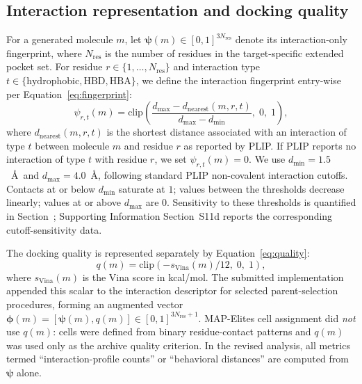 \documentclass[journal=jcisd8,manuscript=article]{achemso}
\begin{document}
\subsection{Interaction representation and docking quality}
\label{sec:fingerprint}

For a generated molecule $m$, let $\boldsymbol{\psi}(m)\in[0,1]^{3N_{\mathrm{res}}}$ denote its interaction-only fingerprint, where $N_{\mathrm{res}}$ is the number of residues in the target-specific extended pocket set. For residue $r\in\{1,\ldots,N_{\mathrm{res}}\}$ and interaction type $t\in\{\mathrm{hydrophobic},\mathrm{HBD},\mathrm{HBA}\}$, we define the interaction fingerprint entry-wise per Equation~\ref{eq:fingerprint}:
\begin{equation}
    \psi_{r,t}(m) = \text{clip}\left(\frac{d_\text{max} - d_\text{nearest}(m, r, t)}{d_\text{max} - d_\text{min}}, \; 0, \; 1\right),
\label{eq:fingerprint}
\end{equation}
where $d_\text{nearest}(m, r, t)$ is the shortest distance associated with an interaction of type $t$ between molecule $m$ and residue $r$ as reported by PLIP.\cite{salentin2015plip} If PLIP reports no interaction of type $t$ with residue $r$, we set $\psi_{r,t}(m) = 0$. We use $d_\text{min} = 1.5$~\AA\ and $d_\text{max} = 4.0$~\AA, following standard PLIP non-covalent interaction cutoffs.\cite{salentin2015plip} Contacts at or below $d_\text{min}$ saturate at $1$; values between the thresholds decrease linearly; values at or above $d_\text{max}$ are $0$. Sensitivity to these thresholds is quantified in Section~; Supporting Information Section~S11d reports the corresponding cutoff-sensitivity data.

The docking quality is represented separately by Equation~\ref{eq:quality}:
\begin{equation}
    q(m) = \text{clip}\left(-s_\text{Vina}(m)/12,\; 0,\; 1\right),
\label{eq:quality}
\end{equation}
where $s_\text{Vina}(m)$ is the Vina score in kcal/mol. The submitted implementation appended this scalar to the interaction descriptor for selected parent-selection procedures, forming an augmented vector $\boldsymbol{\phi}(m) = [\boldsymbol{\psi}(m), q(m)] \in [0,1]^{3N_{\mathrm{res}}+1}$. MAP-Elites cell assignment did \emph{not} use $q(m)$: cells were defined from binary residue-contact patterns and $q(m)$ was used only as the archive quality criterion. In the revised analysis, all metrics termed ``interaction-profile counts'' or ``behavioral distances'' are computed from $\boldsymbol{\psi}$ alone.
\end{document}
